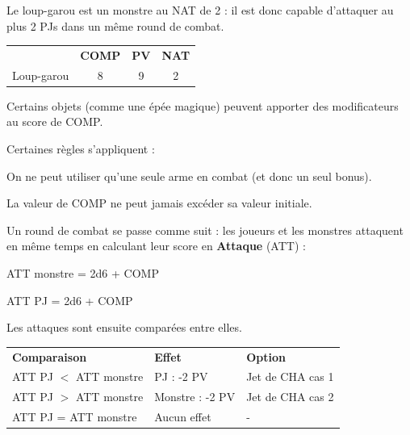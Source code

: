 \begin{frame}[b]
{

\myindent Le loup-garou est un monstre au NAT de 2 : il est donc capable d'attaquer au plus 2 PJs dans un même round de combat.

\begin{center}
\begin{tabular}{lccc}
 & \textbf{COMP} & \textbf{PV} & \textbf{NAT} \\
Loup-garou & 8 & 9 & 2 \\
\end{tabular}
\end{center}



\myindent Certains objets (comme une épée magique) peuvent apporter des modificateurs au score de COMP.

\myindent Certaines règles s'appliquent :

\begin{myitemize}
\item On ne peut utiliser qu'une seule arme en combat (et donc un seul bonus).
\item La valeur de COMP ne peut jamais excéder sa valeur initiale.
\end{myitemize}


\myindent Un round de combat se passe comme suit : les joueurs et les monstres attaquent en même temps en calculant leur score en \textbf{Attaque} (ATT) :
\begin{myitemize}
\item ATT monstre = 2d6 + COMP
\item ATT PJ = 2d6 + COMP
\end{myitemize}

\myindent Les attaques sont ensuite comparées entre elles.

\begin{center}
\begin{tabular}{lll}
\textbf{Comparaison} & \textbf{Effet} & \textbf{Option} \\
ATT PJ $<$ ATT monstre & PJ : -2 PV      & Jet de CHA cas 1 \\
ATT PJ $>$ ATT monstre & Monstre : -2 PV & Jet de CHA cas 2 \\
ATT PJ = ATT monstre & Aucun effet & - \\
\end{tabular}
\end{center}

}
\end{frame}
